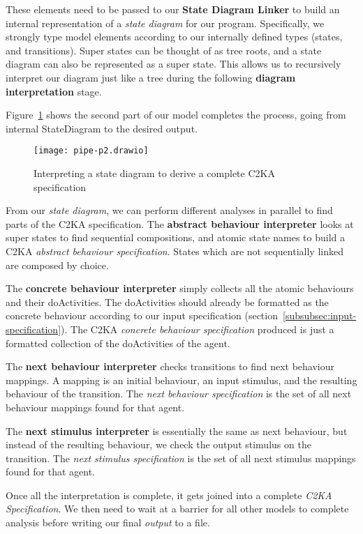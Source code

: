 These elements need to be passed to our \textbf{State Diagram Linker}
to build an internal representation of a \textit{state diagram} for our program.
Specifically, we strongly type model elements according to our internally defined types (states, and transitions).
Super states can be thought of as tree roots, and a state diagram can also be represented as a super state.
This allows us to recursively interpret our diagram just like a tree during the following \textbf{diagram interpretation} stage.

Figure~\ref{fig:pipe-2} shows the  second part of our model completes the process, going from internal StateDiagram to the desired output.
\begin{figure}[ht]
    \centering
    \texttt{[image: pipe-p2.drawio]}
    \caption{Interpreting a state diagram to derive a complete C2KA specification}
    \label{fig:pipe-2}
\end{figure}

From our \textit{state diagram}, we can perform different analyses in parallel to find parts of the C2KA specification.
The \textbf{abstract behaviour interpreter} looks at super states to find sequential compositions,
and atomic state names to build a C2KA \textit{abstract behaviour specification}.
States which are not sequentially linked are composed by choice.

The \textbf{concrete behaviour interpreter} simply collects all the atomic behaviours and their doActivities.
The doActivities should already be formatted as the concrete behaviour according to our input specification (section~\ref{subsubsec:input-specification}).
The C2KA \textit{concrete behaviour specification} produced is just a formatted collection of the doActivities of the agent.

The \textbf{next behaviour interpreter} checks transitions to find next behaviour mappings.
A mapping is an initial behaviour, an input stimulus, and the resulting behaviour of the transition.
The \textit{next behaviour specification} is the set of all next behaviour mappings found for that agent.

The \textbf{next stimulus interpreter} is essentially the same as next behaviour,
but instead of the resulting behaviour, we check the output stimulus on the transition.
The \textit{next stimulus specification} is the set of all next stimulus mappings found for that agent.

Once all the interpretation is complete, it gets joined into a complete \textit{C2KA Specification}.
We then need to wait at a barrier for all other models to complete analysis before writing our final \textit{output} to a file.

